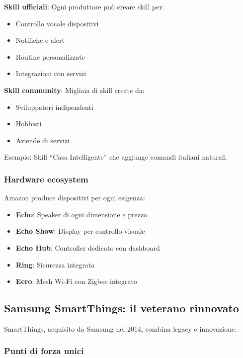 \textbf{Skill ufficiali}: Ogni produttore può creare skill per:
\begin{itemize}
    \item Controllo vocale dispositivi
    \item Notifiche e alert
    \item Routine personalizzate
    \item Integrazioni con servizi
\end{itemize}

\textbf{Skill community}: Migliaia di skill create da:
\begin{itemize}
    \item Sviluppatori indipendenti
    \item Hobbisti
    \item Aziende di servizi
\end{itemize}

Esempio: Skill ``Casa Intelligente'' che aggiunge comandi italiani naturali.

\subsubsection{Hardware ecosystem}

Amazon produce dispositivi per ogni esigenza:

\begin{itemize}
    \item \textbf{Echo}: Speaker di ogni dimensione e prezzo
    \item \textbf{Echo Show}: Display per controllo visuale
    \item \textbf{Echo Hub}: Controller dedicato con dashboard
    \item \textbf{Ring}: Sicurezza integrata
    \item \textbf{Eero}: Mesh Wi-Fi con Zigbee integrato
\end{itemize}

\subsection{Samsung SmartThings: il veterano rinnovato}

SmartThings, acquisito da Samsung nel 2014, combina legacy e innovazione.

\subsubsection{Punti di forza unici}

